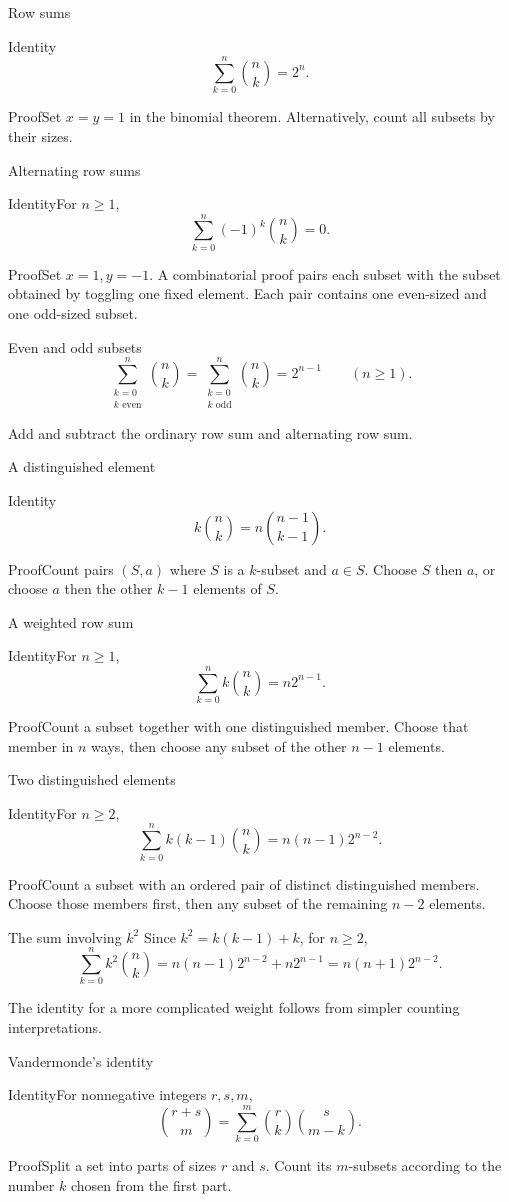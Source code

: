 \documentclass[aspectratio=169,11pt]{beamer}
\newcommand{\Thm}[2]{\begin{block}{#1}#2\end{block}}
\renewcommand{\Proof}[1]{\begin{block}{Proof}\normalsize #1\end{block}}
\newcommand{\gap}{\par\medskip}
\begin{document}
\begin{frame}{Row sums}
\large
\Thm{Identity}{\[\sum_{k=0}^n\binom nk=2^n.\]}
\Proof{Set $x=y=1$ in the binomial theorem. Alternatively, count all subsets by their sizes.}
\end{frame}
\begin{frame}{Alternating row sums}
\large
\Thm{Identity}{For $n\geq1$,
\[\sum_{k=0}^n(-1)^k\binom nk=0.\]}
\Proof{Set $x=1,y=-1$. A combinatorial proof pairs each subset with the subset obtained by toggling one fixed element. Each pair contains one even-sized and one odd-sized subset.}
\end{frame}
\begin{frame}{Even and odd subsets}
\large
\[\sum_{\substack{k=0\\k\text{ even}}}^n\binom nk
=\sum_{\substack{k=0\\k\text{ odd}}}^n\binom nk=2^{n-1}\qquad(n\geq1).\]
\gap Add and subtract the ordinary row sum and alternating row sum.
\end{frame}
\begin{frame}{A distinguished element}
\large
\Thm{Identity}{\[k\binom nk=n\binom{n-1}{k-1}.\]}
\Proof{Count pairs $(S,a)$ where $S$ is a $k$-subset and $a\in S$. Choose $S$ then $a$, or choose $a$ then the other $k-1$ elements of $S$.}
\end{frame}
\begin{frame}{A weighted row sum}
\large
\Thm{Identity}{For $n\geq1$,
\[\sum_{k=0}^n k\binom nk=n2^{n-1}.\]}
\Proof{Count a subset together with one distinguished member. Choose that member in $n$ ways, then choose any subset of the other $n-1$ elements.}
\end{frame}
\begin{frame}{Two distinguished elements}
\large
\Thm{Identity}{For $n\geq2$,
\[\sum_{k=0}^n k(k-1)\binom nk=n(n-1)2^{n-2}.\]}
\Proof{Count a subset with an ordered pair of distinct distinguished members. Choose those members first, then any subset of the remaining $n-2$ elements.}
\end{frame}
\begin{frame}{The sum involving $k^2$}
\large
Since $k^2=k(k-1)+k$, for $n\geq2$,
\[\sum_{k=0}^n k^2\binom nk=n(n-1)2^{n-2}+n2^{n-1}
=n(n+1)2^{n-2}.\]
\gap The identity for a more complicated weight follows from simpler counting interpretations.
\end{frame}
\begin{frame}{Vandermonde's identity}
\large
\Thm{Identity}{For nonnegative integers $r,s,m$,
\[\binom{r+s}{m}=\sum_{k=0}^m\binom rk\binom s{m-k}.\]}
\Proof{Split a set into parts of sizes $r$ and $s$. Count its $m$-subsets according to the number $k$ chosen from the first part.}
\end{frame}
\end{document}
